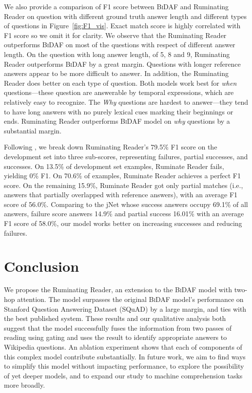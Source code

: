 \documentclass[11pt,letterpaper]{article}
\begin{document}
We also provide a comparison of F1 score between \textsc{BiDAF} and Ruminating Reader on question with different ground truth answer length and different types of questions in Figure~\ref{fig:F1_vis}. Exact match score is highly correlated with F1 score so we omit it for clarity. We observe that the Ruminating Reader outperforms \textsc{BiDAF} on most of the questions with respect of different answer length. On the question with long answer length, of 5, 8 and 9, Ruminating Reader outperforms \textsc{BiDAF} by a great margin. Questions with longer reference answers appear to be more difficult to answer. In addition, the Ruminating Reader does better on each type of question. Both models work best for \textit{when} questions---these question are answerable by temporal expressions, which are relatively easy to recognize. The \textit{Why} questions are hardest to answer---they tend to have long answers with no purely lexical cues marking their beginnings or ends. Ruminating Reader outperforms \textsc{BiDAF} model on \textit{why} questions by a substantial margin.

  Following \citet{Zhang:2017wl}, we break down Ruminating Reader's 79.5\% F1 score on the development set into three sub-scores, representing failures, partial successes, and successes. On 13.5\% of development set examples, Ruminate Reader fails, yielding 0\% F1. On 70.6\% of examples, Ruminate Reader achieves a perfect F1 score. On the remaining 15.9\%, Ruminate Reader got only partial matches (i.e., answers that partially overlapped with reference answers), with an average F1 score of 56.0\%. Comparing to the jNet \cite{Zhang:2017wl} whose success answers occupy 69.1\% of all answers, failure score answers 14.9\% and partial success 16.01\% with an average F1 score of 58.0\%, our model works better on increasing successes and reducing failures. 


 \section{Conclusion}
We propose the Ruminating Reader, an extension to the \textsc{BiDAF} model with two-hop attention. The model surpasses the original \textsc{BiDAF}
model's performance on Stanford Question Answering Dataset (SQuAD) by a large margin, and ties with the best published system. These results and our qualitative analysis both suggest that the model successfully fuses the information from two passes of reading using gating and uses the result to identify appropriate answers to Wikipedia questions. An ablation experiment shows that each of components of this complex model contribute substantially. In future work, we aim to find ways to simplify this model without impacting performance, to explore the possibility of yet deeper models, and to expand our study to machine comprehension tasks more broadly. 
 
\end{document}
